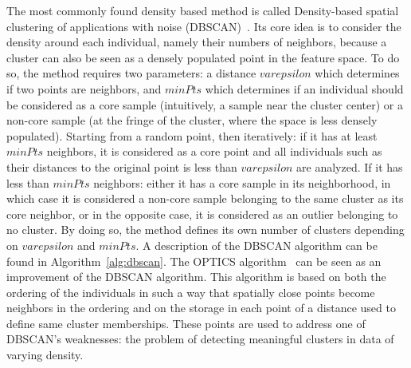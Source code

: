 The most commonly found density based method is called Density-based spatial clustering of applications with noise (DBSCAN)~\cite{ester1996density}. Its core idea is to consider the density around each individual, namely their numbers of neighbors, because a cluster can also be seen as a densely populated point in the feature space. To do so, the method requires two parameters: a distance $varepsilon$ which determines if two points are neighbors, and $minPts$ which determines if an individual should be considered as a core sample (intuitively, a sample near the cluster center) or a non-core sample (at the fringe of the cluster, where the space is less densely populated). Starting from a random point, then iteratively: if it has at least $minPts$ neighbors, it is considered as a core point and all individuals such as their distances to the original point is less than $varepsilon$ are analyzed. If it has less than $minPts$ neighbors: either it has a core sample in its neighborhood, in which case it is considered a non-core sample belonging to the same cluster as its core neighbor, or in the opposite case, it is considered as an outlier belonging to no cluster. By doing so, the method defines its own number of clusters depending on $varepsilon$ and $minPts$. A description of the DBSCAN algorithm can be found in Algorithm~\ref{alg:dbscan}. The OPTICS algorithm~\cite{ankerst1999optics} can be seen as an improvement of the DBSCAN algorithm. This algorithm is based on both the ordering of the individuals in such a way that spatially close points become neighbors in the ordering and on the storage in each point of a distance used to define same cluster memberships. These points are used to address one of DBSCAN's weaknesses: the problem of detecting meaningful clusters in data of varying density.

